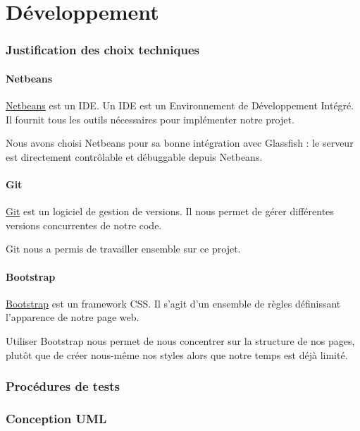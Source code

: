 \part{Développement}
\section{Justification des choix techniques}

	\subsection{Netbeans}

	\href{https://netbeans.org/}{Netbeans} est un IDE. Un IDE est un Environnement de Développement Intégré. Il fournit tous les outils nécessaires pour implémenter notre projet.

	Nous avons choisi Netbeans pour sa bonne intégration avec Glassfish : le serveur est directement contrôlable et débuggable depuis Netbeans.

	\subsection{Git}

		\href{http://git-scm.com/}{Git} est un logiciel de gestion de versions. Il nous permet de gérer différentes versions concurrentes de notre code.

		Git nous a permis de travailler ensemble sur ce projet.

	\subsection{Bootstrap}

		\href{http://getbootstrap.com/}{Bootstrap} est un framework CSS. Il s'agit d'un ensemble de règles définissant l'apparence de notre page web.

		Utiliser Bootstrap nous permet de nous concentrer sur la structure de nos pages, plutôt que de créer nous-même nos styles alors que notre temps est déjà limité.

\section{Procédures de tests}


\clearpage
\section{Conception UML}
